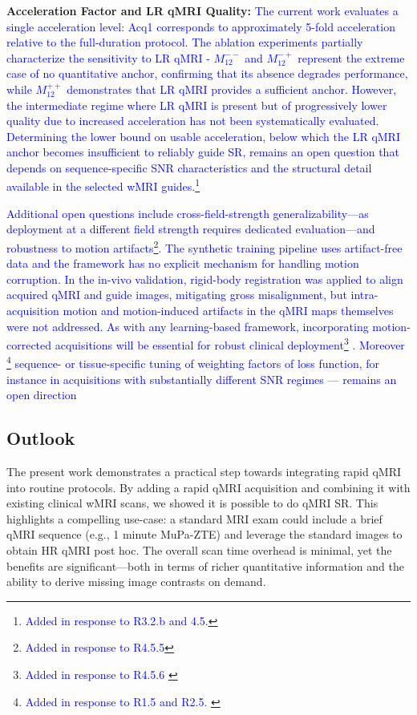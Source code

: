 \documentclass[journal,twoside,web]{ieeecolor}
\newcommand{\added}[1]{\textcolor{blue}{#1}}      %
\begin{document}
\textbf{Acceleration Factor and LR qMRI Quality:} \added{The current 
work evaluates a single acceleration level: Acq1 corresponds to 
approximately 5-fold acceleration relative to the full-duration 
protocol. The ablation experiments partially characterize the 
sensitivity to LR qMRI - $M_{12}^{--}$ and $M_{12}^{-+}$ 
represent the extreme case of no quantitative anchor, confirming that 
its absence degrades performance, while $M_{12}^{++}$ demonstrates 
that LR qMRI provides a sufficient anchor. However, 
the intermediate regime where LR qMRI is present but of 
progressively lower quality due to increased acceleration has not 
been systematically evaluated. Determining the lower bound on usable 
acceleration, below which the LR qMRI anchor becomes insufficient to 
reliably guide SR, remains an open question that depends on 
sequence-specific SNR characteristics and the structural detail 
available in the selected wMRI guides.\footnote{\textcolor{blue}{Added in response to R3.2.b and 4.5.}}}


\added{Additional open questions include cross-field-strength 
generalizability---as deployment at a different field strength requires 
dedicated evaluation---and robustness to motion artifacts\footnote{\textcolor{blue}{Added in response to R4.5.5}}. The synthetic training pipeline uses artifact-free data and the framework 
has no explicit mechanism for handling motion corruption. In the 
in-vivo validation, rigid-body registration was applied to align 
acquired qMRI and guide images, mitigating gross misalignment, but 
intra-acquisition motion and motion-induced artifacts in the qMRI 
maps themselves were not addressed. As with any learning-based 
framework, incorporating motion-corrected acquisitions will be 
essential for robust clinical deployment\footnote{\textcolor{blue}{Added in response to R4.5.6 }} . Moreover \footnote{\textcolor{blue}{Added in response to R1.5 and R2.5. }} sequence- or tissue-specific tuning of weighting factors of loss function, for instance in acquisitions with substantially different SNR regimes — remains an open direction}



\subsection{Outlook}
The present work demonstrates a practical step towards integrating rapid qMRI into routine protocols. By adding a rapid qMRI acquisition and combining it with existing clinical wMRI scans, we showed it is possible to do qMRI SR. This highlights a compelling use-case: a standard MRI exam could include a brief qMRI sequence (e.g., 1 minute MuPa-ZTE) and leverage the standard images to obtain HR qMRI post hoc. The overall scan time overhead is minimal, yet the benefits are significant—both in terms of richer quantitative information and the ability to derive missing image contrasts on demand.
\end{document}
